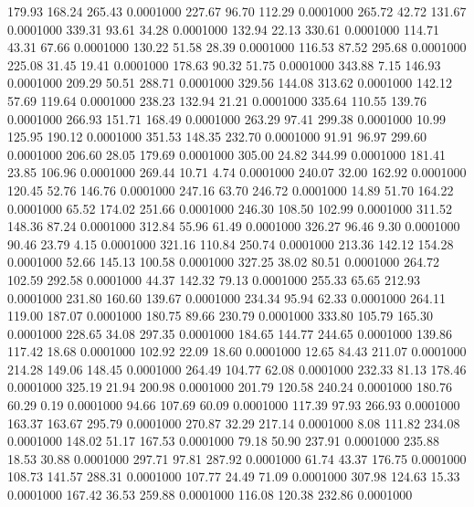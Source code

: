  179.93  168.24  265.43   0.0001000
 227.67   96.70  112.29   0.0001000
 265.72   42.72  131.67   0.0001000
 339.31   93.61   34.28   0.0001000
 132.94   22.13  330.61   0.0001000
 114.71   43.31   67.66   0.0001000
 130.22   51.58   28.39   0.0001000
 116.53   87.52  295.68   0.0001000
 225.08   31.45   19.41   0.0001000
 178.63   90.32   51.75   0.0001000
 343.88    7.15  146.93   0.0001000
 209.29   50.51  288.71   0.0001000
 329.56  144.08  313.62   0.0001000
 142.12   57.69  119.64   0.0001000
 238.23  132.94   21.21   0.0001000
 335.64  110.55  139.76   0.0001000
 266.93  151.71  168.49   0.0001000
 263.29   97.41  299.38   0.0001000
  10.99  125.95  190.12   0.0001000
 351.53  148.35  232.70   0.0001000
  91.91   96.97  299.60   0.0001000
 206.60   28.05  179.69   0.0001000
 305.00   24.82  344.99   0.0001000
 181.41   23.85  106.96   0.0001000
 269.44   10.71    4.74   0.0001000
 240.07   32.00  162.92   0.0001000
 120.45   52.76  146.76   0.0001000
 247.16   63.70  246.72   0.0001000
  14.89   51.70  164.22   0.0001000
  65.52  174.02  251.66   0.0001000
 246.30  108.50  102.99   0.0001000
 311.52  148.36   87.24   0.0001000
 312.84   55.96   61.49   0.0001000
 326.27   96.46    9.30   0.0001000
  90.46   23.79    4.15   0.0001000
 321.16  110.84  250.74   0.0001000
 213.36  142.12  154.28   0.0001000
  52.66  145.13  100.58   0.0001000
 327.25   38.02   80.51   0.0001000
 264.72  102.59  292.58   0.0001000
  44.37  142.32   79.13   0.0001000
 255.33   65.65  212.93   0.0001000
 231.80  160.60  139.67   0.0001000
 234.34   95.94   62.33   0.0001000
 264.11  119.00  187.07   0.0001000
 180.75   89.66  230.79   0.0001000
 333.80  105.79  165.30   0.0001000
 228.65   34.08  297.35   0.0001000
 184.65  144.77  244.65   0.0001000
 139.86  117.42   18.68   0.0001000
 102.92   22.09   18.60   0.0001000
  12.65   84.43  211.07   0.0001000
 214.28  149.06  148.45   0.0001000
 264.49  104.77   62.08   0.0001000
 232.33   81.13  178.46   0.0001000
 325.19   21.94  200.98   0.0001000
 201.79  120.58  240.24   0.0001000
 180.76   60.29    0.19   0.0001000
  94.66  107.69   60.09   0.0001000
 117.39   97.93  266.93   0.0001000
 163.37  163.67  295.79   0.0001000
 270.87   32.29  217.14   0.0001000
   8.08  111.82  234.08   0.0001000
 148.02   51.17  167.53   0.0001000
  79.18   50.90  237.91   0.0001000
 235.88   18.53   30.88   0.0001000
 297.71   97.81  287.92   0.0001000
  61.74   43.37  176.75   0.0001000
 108.73  141.57  288.31   0.0001000
 107.77   24.49   71.09   0.0001000
 307.98  124.63   15.33   0.0001000
 167.42   36.53  259.88   0.0001000
 116.08  120.38  232.86   0.0001000
